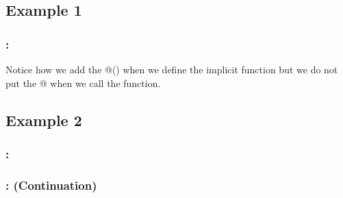 \documentclass[11pt]{beamer}
\begin{document}
\subsection{Example 1}
\begin{frame}
	\frametitle{\secname: \subsecname}
	
	
	\begin{block}{}
		Notice how we add the @() when we define the implicit function but we do not put the @ when we call the function. 
	\end{block}
\end{frame}


\subsection{Example 2}
\begin{frame}
	\frametitle{\secname: \subsecname}
	
	
\end{frame}

\begin{frame}
	\frametitle{\secname: \subsecname\; (Continuation)}
	
	
\end{frame}
\end{document}
